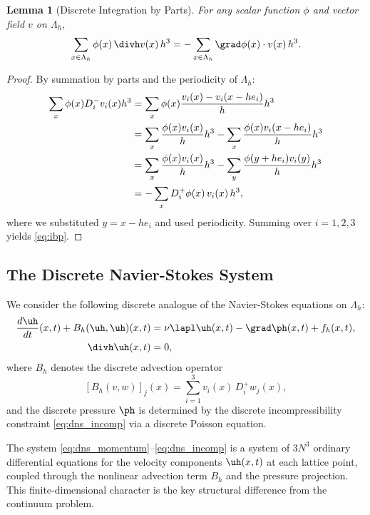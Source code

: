 \documentclass[12pt, a4paper]{article}
\theoremstyle{plain}
\newtheorem{lemma}[theorem]{Lemma}
\theoremstyle{definition}
\begin{document}
\begin{lemma}[Discrete Integration by Parts]\label{lem:ibp}
  For any scalar function $\phi$ and vector field $v$ on $\Lambda_h$,
  \begin{equation}\label{eq:ibp}
    \sum_{x \in \Lambda_h} \phi(x) \, \divh v(x) \, h^3
    = -\sum_{x \in \Lambda_h} \grad \phi(x) \cdot v(x) \, h^3.
  \end{equation}
\end{lemma}

\begin{proof}
  By summation by parts and the periodicity of $\Lambda_h$:
  \begin{align}
    \sum_{x} \phi(x) D_i^- v_i(x) h^3
    &= \sum_{x} \phi(x) \frac{v_i(x) - v_i(x - he_i)}{h} h^3 \notag \\
    &= \sum_{x} \frac{\phi(x) v_i(x)}{h} h^3 - \sum_{x} \frac{\phi(x) v_i(x-he_i)}{h} h^3 \notag \\
    &= \sum_{x} \frac{\phi(x) v_i(x)}{h} h^3 - \sum_{y} \frac{\phi(y+he_i) v_i(y)}{h} h^3 \notag \\
    &= -\sum_{x} D_i^+ \phi(x) \, v_i(x) \, h^3,
  \end{align}
  where we substituted $y = x - he_i$ and used periodicity.
  Summing over $i = 1,2,3$ yields \eqref{eq:ibp}.
\end{proof}

\subsection{The Discrete Navier-Stokes System}

We consider the following discrete analogue of the Navier-Stokes equations on $\Lambda_h$:
\begin{align}
  \frac{d\uh}{dt}(x,t) + B_h(\uh, \uh)(x,t) &= \nu \lapl \uh(x,t) - \grad \ph(x,t) + f_h(x,t),
  \label{eq:dns_momentum} \\
  \divh \uh(x,t) &= 0,
  \label{eq:dns_incomp}
\end{align}
where $B_h$ denotes the discrete advection operator
\begin{equation}\label{eq:advection}
  [B_h(v,w)]_j(x) = \sum_{i=1}^{3} v_i(x) \, D_i^+ w_j(x),
\end{equation}
and the discrete pressure $\ph$ is determined by the discrete incompressibility
constraint \eqref{eq:dns_incomp} via a discrete Poisson equation.

\begin{remark}\label{rem:ode}
  The system \eqref{eq:dns_momentum}--\eqref{eq:dns_incomp} is a system of
  $3N^3$ ordinary differential equations for the velocity components
  $\uh(x,t)$ at each lattice point, coupled through the nonlinear advection
  term $B_h$ and the pressure projection. This finite-dimensional character
  is the key structural difference from the continuum problem.
\end{remark}
\end{document}
